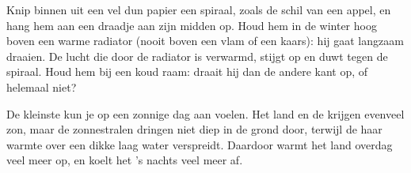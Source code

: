 \begin{inthelab}
Knip binnen uit een vel dun papier een spiraal, zoals de schil van een
appel, en hang hem aan een draadje aan zijn midden op. Houd hem in de winter
hoog boven een warme radiator (nooit boven een vlam of een kaars): hij gaat
langzaam draaien. De lucht die door de radiator is verwarmd, stijgt op en
duwt tegen de spiraal. Houd hem bij een koud raam: draait hij dan de andere
kant op, of helemaal niet?
\end{inthelab}

De kleinste  kun je op een zonnige dag aan  voelen. Het
land en de  krijgen evenveel zon, maar de zonnestralen dringen niet diep
in de grond door, terwijl de  haar warmte over een dikke laag water
verspreidt. Daardoor warmt het land overdag veel meer op, en koelt het 's
nachts veel meer af.


